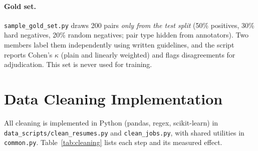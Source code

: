 \documentclass[11pt,a4paper]{article}
\newcommand{\code}[1]{\texttt{\small #1}}
\begin{document}
\paragraph{Gold set.} \code{sample\_gold\_set.py} draws 200 pairs \emph{only from the test
split} (50\% positives, 30\% hard negatives, 20\% random negatives; pair type hidden from
annotators). Two members label them independently using written guidelines, and the script
reports Cohen's $\kappa$ (plain and linearly weighted) and flags disagreements for
adjudication. This set is never used for training.

\section{Data Cleaning Implementation}\label{sec:cleaning}
All cleaning is implemented in Python (pandas, regex, scikit-learn) in
\code{data\_scripts/clean\_resumes.py} and \code{clean\_jobs.py}, with shared utilities in
\code{common.py}. Table~\ref{tab:cleaning} lists each step and its measured effect.
\end{document}
